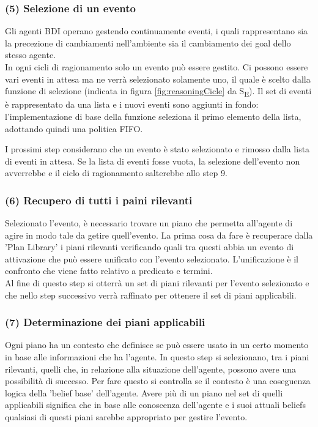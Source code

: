 \documentclass[12pt,a4paper,openright,twoside]{report}
\begin{document}
\subsubsection{(5) Selezione di un evento}
Gli agenti BDI operano gestendo continuamente eventi, i quali rappresentano sia la precezione di cambiamenti nell'ambiente sia il cambiamento dei goal dello stesso agente.
\\
In ogni cicli di ragionamento solo un evento pu\`o essere gestito. Ci possono essere vari eventi in attesa ma ne verr\`a selezionato solamente uno, il quale \`e scelto dalla funzione di selezione (indicata in figura \ref{fig:reasoningCicle} da S\textsubscript{E}). Il set di eventi \`e rappresentato da una lista e i nuovi eventi sono aggiunti in fondo: l'implementazione di base della funzione seleziona il primo elemento della lista, adottando quindi una politica FIFO.

I prossimi step considerano che un evento \`e stato selezionato e rimosso dalla lista di eventi in attesa. Se la lista di eventi fosse vuota, la selezione dell'evento non avverrebbe e il ciclo di ragionamento salterebbe allo step 9.

\subsubsection{(6) Recupero di tutti i paini rilevanti}
Selezionato l'evento, \`e necessario trovare un piano che permetta all'agente di agire in modo tale da getire quell'evento. La prima cosa da fare \`e recuperare dalla 'Plan Library' i piani rilevanti verificando quali tra questi abbia un evento di attivazione che pu\`o essere unificato con l'evento selezionato. L'unificazione \`e il confronto che viene fatto relativo a predicato e termini.
\\
Al fine di questo step si otterr\`a un set di piani rilevanti per l'evento selezionato e che nello step successivo verr\`a raffinato per ottenere il set di piani applicabili.


\subsubsection{(7) Determinazione dei piani applicabili}
Ogni piano ha un contesto che definisce se pu\`o essere usato in un certo momento in base alle informazioni che ha l'agente. In questo step si selezionano, tra i piani rilevanti, quelli che, in relazione alla situazione dell'agente, possono avere una possibilit\`a di successo. Per fare questo si controlla se il contesto \`e una coseguenza logica della 'belief base' dell'agente. Avere pi\`u di un piano nel set di quelli applicabili significa che in base alle conoscenza dell'agente e i suoi attuali beliefs qualsiasi di questi piani sarebbe appropriato per gestire l'evento.
\end{document}
